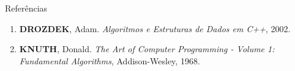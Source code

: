 \begin{frame}[fragile]{Referências}

    \begin{enumerate}
        \item \textbf{DROZDEK}, Adam. \textit{Algoritmos e Estruturas de Dados em C++}, 2002.

        \item \textbf{KNUTH}, Donald. \textit{The Art of Computer Programming - Volume 1:
            Fundamental Algorithms}, Addison-Wesley, 1968.
    \end{enumerate}

\end{frame}
